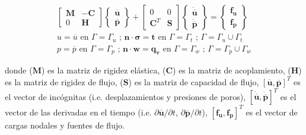 \begin{ceqn} %
\begin{subequations}\label{eq:equ357}
\begin{gather}
\begin{bmatrix}
       \mathbf{M}  & \mathbf{-C}   \\[0.3em]
       0		   & \mathbf{H}       		
\end{bmatrix}
\begin{Bmatrix}
       \mathbf{\overline{u}}    \\[0.3em]
       \mathbf{\overline{p}}      		
\end{Bmatrix}
+
\begin{bmatrix}
       0             & 0           \\[0.3em]
       \mathbf{C}^T  & \mathbf{S}       		
\end{bmatrix}
\begin{Bmatrix}
       \mathbf{\dot{\overline{u}}}    \\[0.3em]
       \mathbf{\dot{\overline{p}}}      		
\end{Bmatrix}
= 
\begin{Bmatrix}
       \mathbf{f_u}    \\[0.3em]
       \mathbf{f_p}      		
\end{Bmatrix} \label{eq:equ357a}\\[12pt]
u = \overline{u} \text{  en  } \Gamma = \Gamma_u \text{ ;  } \mathbf{n}\cdot\mathbf{\sigma}=\mathbf{t} \text{  en  } \Gamma = \Gamma_t \text{ ; } \Gamma = \Gamma_u \cup \Gamma_t \label{eq:equ357b}\\[12pt]
p = \overline{p} \text{  en  } \Gamma = \Gamma_p \text{ ;  } \mathbf{n}\cdot\mathbf{w}=\mathbf{q_v} \text{  en  } \Gamma = \Gamma_w \text{ ; } \Gamma = \Gamma_p \cup \Gamma_w \label{eq:equ357c}
\end{gather}
\end{subequations}
\end{ceqn}

donde ($\mathbf{M}$) es la matriz de rigidez elástica, ($\mathbf{C}$) es la matriz de acoplamiento, ($\mathbf{H}$) es la matriz de rigidez de flujo, ($\mathbf{S}$) es la matriz de capacidad de flujo, $[\mathbf{\overline{u}}, \mathbf{\overline{p}} ]^T$ es el vector de incógnitas (i.e. desplazamientos y presiones de poros),  $[\mathbf{\dot{\overline{u}}},\mathbf{\dot{\overline{p}}} ]^T$ es el vector de las derivadas en el tiempo (i.e. $\partial \mathbf{\overline{u}}/\partial t$, $\partial \mathbf{\overline{p}}/\partial t$), $[\mathbf{f_u}, \mathbf{f_p} ]^T$ es el vector de cargas nodales y fuentes de flujo.\bigskip


